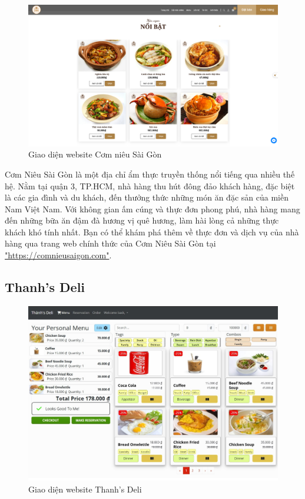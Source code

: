 \begin{figure}[H]
    \centering
    \includegraphics[width=15cm]{Images/comnieusaigon.png}
    \vspace{0.5cm}
    \caption{Giao diện website Cơm niêu Sài Gòn}
    \label{fig:my_label}
\end{figure}

Cơm Niêu Sài Gòn là một địa chỉ ẩm thực truyền thống nổi tiếng qua nhiều thế hệ. Nằm tại quận 3, TP.HCM, nhà hàng thu hút đông đảo khách hàng, đặc biệt là các gia đình và du khách, đến thưởng thức những món ăn đặc sản của miền Nam Việt Nam. Với không gian ấm cúng và thực đơn phong phú, nhà hàng mang đến những bữa ăn đậm đà hương vị quê hương, làm hài lòng cả những thực khách khó tính nhất. Bạn có thể khám phá thêm về thực đơn và dịch vụ của nhà hàng qua trang web chính thức của Cơm Niêu Sài Gòn tại \href{https://comnieusaigon.com}{"https://comnieusaigon.com"}.

\subsection{Thanh's Deli}

\begin{figure}[H]
    \centering
    \includegraphics[width=15cm]{Images/thanhsdeli.png}
    \vspace{0.5cm}
    \caption{Giao diện website Thanh's Deli}
    \label{fig:my_label}
\end{figure}


